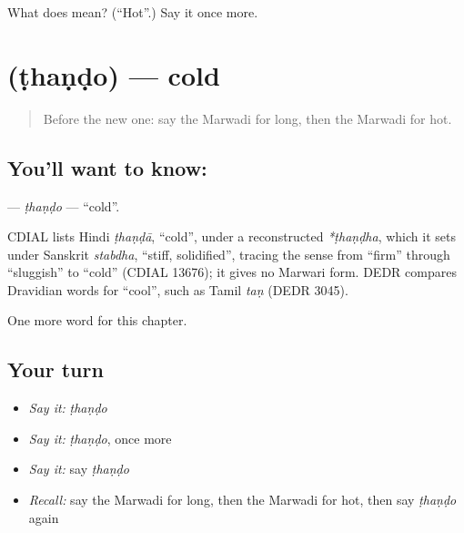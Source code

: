 \begin{tcolorbox}[breakable,colback=teal!4,colframe=teal!35!black,title={Before you move on}]
What does  mean? (\textquotedblleft{}Hot\textquotedblright{}.) Say it once more.
\end{tcolorbox}
\section[\texorpdfstring{\mw{ठंडो} (ṭhaṇḍo)}{ठंडो (ṭhaṇḍo)}]{ (ṭhaṇḍo) — cold}

\label{lesson:MW-C74-thando}



\begin{quote}
Before the new one: say the Marwadi for long, then the Marwadi for hot.
\end{quote}

\subsection*{You'll want to know: }
\textbf{} — \emph{ṭhaṇḍo} — \textquotedblleft{}cold\textquotedblright{}.

\begin{cousinweb}
CDIAL lists Hindi \emph{ṭhaṇḍā}, \textquotedblleft{}cold\textquotedblright{}, under a reconstructed \emph{*ṭhaṇḍha}, which it sets under Sanskrit \emph{stabdha}, \textquotedblleft{}stiff, solidified\textquotedblright{}, tracing the sense from \textquotedblleft{}firm\textquotedblright{} through \textquotedblleft{}sluggish\textquotedblright{} to \textquotedblleft{}cold\textquotedblright{} (CDIAL 13676); it gives no Marwari form. DEDR compares Dravidian words for \textquotedblleft{}cool\textquotedblright{}, such as Tamil \emph{taṇ} (DEDR 3045).
\end{cousinweb}

\begin{grammarlens}[title={What you've built}]
One more word for this chapter.
\end{grammarlens}

\subsection*{Your turn}
\begin{itemize}
\raggedright
  \item \emph{Say it:} \emph{ṭhaṇḍo}
  \item \emph{Say it:} \emph{ṭhaṇḍo}, once more
  \item \emph{Say it:} say \emph{ṭhaṇḍo}
  \item \emph{Recall:} say the Marwadi for long, then the Marwadi for hot, then say \emph{ṭhaṇḍo} again
\end{itemize}

